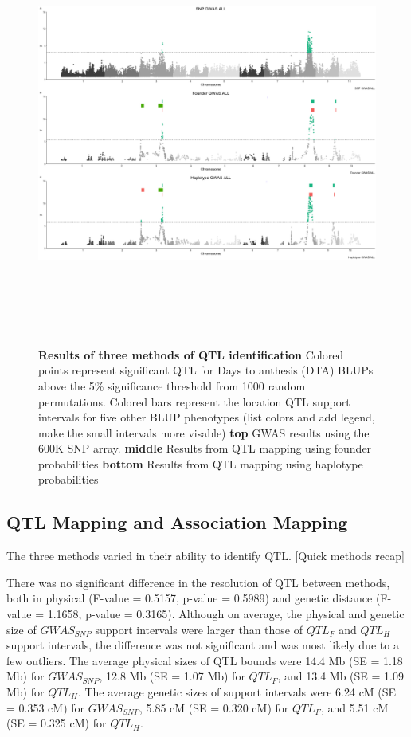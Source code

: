 \documentclass[article,9pt,twocolumn,twoside]{rilabRxiv}
\begin{document}
\begin{figure}[hb!]
\includegraphics[width=\textwidth,height=14cm]{figures/Methods_Fig3_ALL_all_phenos.png}
\caption{\textbf{Results of three methods of QTL identification} Colored points represent significant QTL for Days to anthesis (DTA) BLUPs above the 5\% significance threshold from 1000 random permutations. Colored bars represent the location QTL support intervals for five other BLUP phenotypes (list colors and add legend, make the small intervals more visable) \textbf{top} GWAS results using the 600K SNP array. \textbf{middle} Results from QTL mapping using founder probabilities \textbf{bottom} Results from QTL mapping using haplotype probabilities}
\label{fig:figure3}
\end{figure}

\subsection{QTL Mapping and Association Mapping}
The three methods varied in their ability to identify QTL. [Quick methods recap]

There was no significant difference in the resolution of QTL between methods, both in physical (F-value = 0.5157, p-value = 0.5989) and genetic distance (F-value = 1.1658, p-value = 0.3165).
Although on average, the physical and genetic size of $GWAS_{SNP}$ support intervals were larger than those of $QTL_F$ and $QTL_H$ support intervals, the difference was not significant and was most likely due to a few outliers.
The average physical sizes of QTL bounds were 14.4 Mb (SE = 1.18 Mb) for $GWAS_{SNP}$, 12.8 Mb (SE = 1.07 Mb) for $QTL_F$, and 13.4 Mb (SE = 1.09 Mb) for $QTL_H$.
The average genetic sizes of support intervals were 6.24 cM (SE = 0.353 cM) for $GWAS_{SNP}$, 5.85 cM (SE = 0.320 cM) for $QTL_F$, and 5.51 cM (SE = 0.325 cM) for $QTL_H$.
\end{document}
